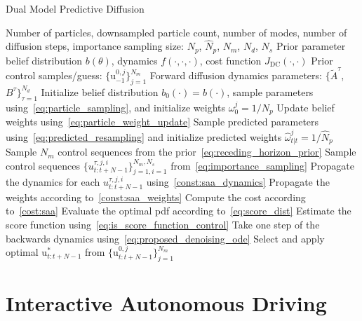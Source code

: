 \documentclass[letterpaper, 10 pt, conference]{IEEEconf}
\begin{document}
\begin{algorithm}[h]
\footnotesize
\caption{Dual Model Predictive Diffusion}
\label{alg:DMPD}
\begin{algorithmic}[1]
\Require Number of particles, downsampled particle count, number of modes, number of diffusion steps, importance sampling size: $N_p$, $\hat{N}_p$, $N_m$, $N_d$, $N_s$
\Require Prior parameter belief distribution $b(\theta)$, dynamics $f(\cdot, \cdot, \cdot)$, cost function $J_{\text{DC}}(\cdot, \cdot)$
\Require Prior control samples/guess: $\{\mathrm{u}^{0, j}_{-1}\}_{j=1}^{N_m}$
\Require Forward diffusion dynamics parameters: $\{\tilde{A}^{\tau}$, $B^{\tau} \}_{\tau=1}^{N_d}$
\State Initialize belief distribution $b_{0}(\cdot) = b(\cdot)$, sample parameters using~\eqref{eq:particle_sampling}, and initialize weights $\omega^{j}_{0} = 1 / N_p$
    \State Update belief weights using~\eqref{eq:particle_weight_update}
    \State Sample predicted parameters using~\eqref{eq:predicted_resampling} and initialize predicted weights $\hat{\omega}^{j}_{t|t} = 1 / \hat{N}_p$
    \State Sample $N_m$ control sequences from the prior~\eqref{eq:receding_horizon_prior}
        \State Sample control sequences $\{u_{t:t+N-1}^{\tau, j, i} \}_{j=1, i=1}^{N_m, N_{s}}$ from~\eqref{eq:importance_sampling}
        \State Propagate the dynamics for each $u_{t:t+N-1}^{\tau, j, i}$
        using~\eqref{const:saa_dynamics}
        \State Propagate the weights 
        according to~\eqref{const:saa_weights}
        \State Compute the cost 
        according to~\eqref{cost:saa}
        \State Evaluate the optimal pdf
        according to~\eqref{eq:score_dist}
        \State Estimate the score function using~\eqref{eq:is_score_function_control}
        \State Take one step of the backwards dynamics using~\eqref{eq:proposed_denoising_ode}
    \EndFor
    \State Select and apply optimal $\mathrm{u}_{t:t+N-1}^{\ast}$ from $\{\mathrm{u}_{t:t+N-1}^{0, j} \}_{j=1}^{N_m}$
\EndFor
\end{algorithmic}
\end{algorithm}

\section{Interactive Autonomous Driving} \label{sec:interactive_autonomous_driving}
\end{document}
